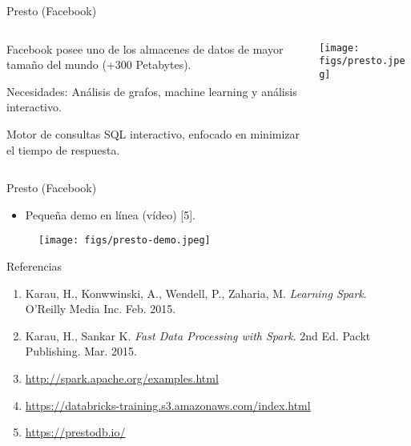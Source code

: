 
\begin{frame}{Presto (Facebook)}
 \begin{columns}[T]
    \begin{column}{.8\textwidth}
     \begin{wideitemize}
      \item Facebook posee uno de los almacenes de datos de mayor tamaño del
      mundo (+300 Petabytes).
      \item Necesidades: Análisis de grafos, machine learning y análisis
      interactivo.
      \item Motor de consultas SQL interactivo, enfocado en minimizar el tiempo
      de respuesta.

    \end{wideitemize}
    \end{column}
    \begin{column}{.2\textwidth}
    \vspace*{.7cm}
    \texttt{[image: figs/presto.jpeg]}
    \end{column}
  \end{columns}

\end{frame}


\begin{frame}{Presto (Facebook)}
\begin{itemize}
 \item Pequeña demo en línea (vídeo) [5].
\end{itemize}

\begin{figure}
 \centering
 \texttt{[image: figs/presto-demo.jpeg]}
\end{figure}

\end{frame}


\begin{frame}{Referencias}
 \begin{enumerate}
  \item Karau, H., Konwwinski, A., Wendell, P., Zaharia, M. \textit{Learning Spark}.
  O'Reilly Media Inc. Feb. 2015.
  \item Karau, H., Sankar K. \textit{Fast Data Processing with Spark}. 2nd Ed.
  Packt Publishing. Mar. 2015.
  \item \url{http://spark.apache.org/examples.html}
  \item \url{https://databricks-training.s3.amazonaws.com/index.html}
  \item \url{https://prestodb.io/}
 \end{enumerate}

\end{frame}
